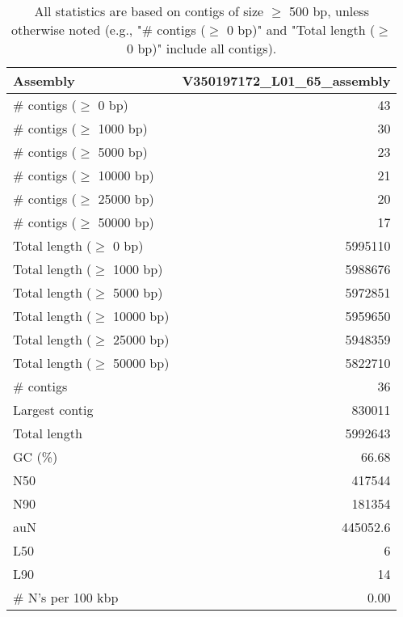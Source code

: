 \documentclass[12pt,a4paper]{article}
\begin{document}
\begin{table}[ht]
\begin{center}
\caption{All statistics are based on contigs of size $\geq$ 500 bp, unless otherwise noted (e.g., "\# contigs ($\geq$ 0 bp)" and "Total length ($\geq$ 0 bp)" include all contigs).}
\begin{tabular}{|l*{1}{|r}|}
\hline
Assembly & V350197172\_L01\_65\_assembly \\ \hline
\# contigs ($\geq$ 0 bp) & 43 \\ \hline
\# contigs ($\geq$ 1000 bp) & 30 \\ \hline
\# contigs ($\geq$ 5000 bp) & 23 \\ \hline
\# contigs ($\geq$ 10000 bp) & 21 \\ \hline
\# contigs ($\geq$ 25000 bp) & 20 \\ \hline
\# contigs ($\geq$ 50000 bp) & 17 \\ \hline
Total length ($\geq$ 0 bp) & 5995110 \\ \hline
Total length ($\geq$ 1000 bp) & 5988676 \\ \hline
Total length ($\geq$ 5000 bp) & 5972851 \\ \hline
Total length ($\geq$ 10000 bp) & 5959650 \\ \hline
Total length ($\geq$ 25000 bp) & 5948359 \\ \hline
Total length ($\geq$ 50000 bp) & 5822710 \\ \hline
\# contigs & 36 \\ \hline
Largest contig & 830011 \\ \hline
Total length & 5992643 \\ \hline
GC (\%) & 66.68 \\ \hline
N50 & 417544 \\ \hline
N90 & 181354 \\ \hline
auN & 445052.6 \\ \hline
L50 & 6 \\ \hline
L90 & 14 \\ \hline
\# N's per 100 kbp & 0.00 \\ \hline
\end{tabular}
\end{center}
\end{table}
\end{document}
